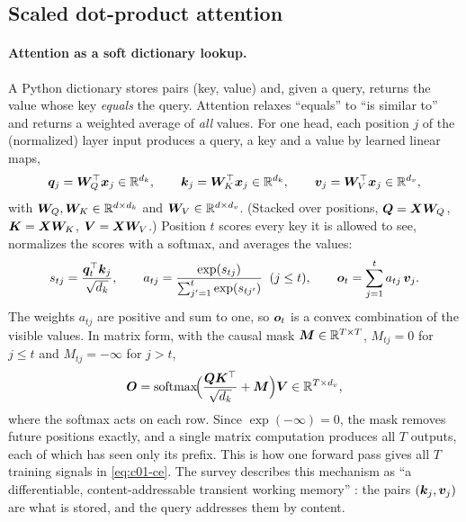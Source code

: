 \subsection{Scaled dot-product attention}\label{sec:c01-attention}

\paragraph{Attention as a soft dictionary lookup.} A Python dictionary stores pairs
(key, value) and, given a query, returns the value whose key \emph{equals} the query.
Attention relaxes ``equals'' to ``is similar to'' and returns a weighted average of
\emph{all} values. For one head, each position $j$ of the (normalized) layer input produces a
query, a key and a value by learned linear maps,
\begin{equation}\label{eq:c01-qkv}
  \bm{q}_j = \bm{W}_Q^{\top}\bm{x}_j \in \mathbb{R}^{d_k},\qquad
  \bm{k}_j = \bm{W}_K^{\top}\bm{x}_j \in \mathbb{R}^{d_k},\qquad
  \bm{v}_j = \bm{W}_V^{\top}\bm{x}_j \in \mathbb{R}^{d_v},
\end{equation}
with $\bm{W}_Q, \bm{W}_K \in \mathbb{R}^{d \times d_k}$ and $\bm{W}_V \in \mathbb{R}^{d \times d_v}$. (Stacked over
positions, $\bm{Q} = \bm{X}\bm{W}_Q$, $\bm{K} = \bm{X}\bm{W}_K$, $\bm{V} = \bm{X}\bm{W}_V$.) Position $t$ scores every
key it is allowed to see, normalizes the scores with a softmax, and averages the values:
\begin{equation}\label{eq:c01-attn-token}
  s_{tj} = \frac{\bm{q}_t^{\top}\bm{k}_j}{\sqrt{d_k}},\qquad
  a_{tj} = \frac{\exp(s_{tj})}{\sum_{j'=1}^{t}\exp(s_{tj'})}\;\;(j \le t),\qquad
  \bm{o}_t = \sum_{j=1}^{t} a_{tj}\,\bm{v}_j .
\end{equation}
The weights $a_{tj}$ are positive and sum to one, so $\bm{o}_t$ is a convex combination of the
visible values. In matrix form, with the causal mask $\bm{M} \in \mathbb{R}^{T\times T}$,
$M_{tj} = 0$ for $j \le t$ and $M_{tj} = -\infty$ for $j > t$,
\begin{equation}\label{eq:c01-attn-matrix}
  \bm{O} = \operatorname{softmax}\!\Bigl(\frac{\bm{Q}\bm{K}^{\top}}{\sqrt{d_k}} + \bm{M}\Bigr)\bm{V} \in \mathbb{R}^{T \times d_v},
\end{equation}
where the softmax acts on each row. Since $\exp(-\infty) = 0$, the mask removes future
positions exactly, and a single matrix computation produces all $T$ outputs, each of which
has seen only its prefix. This is how one forward pass gives all $T$ training signals in
\eqref{eq:c01-ce}. The survey describes this mechanism as ``a differentiable,
content-addressable transient working memory'' \citep{zhoubian2026memory}: the pairs
$(\bm{k}_j, \bm{v}_j)$ are what is stored, and the query addresses them by content.

